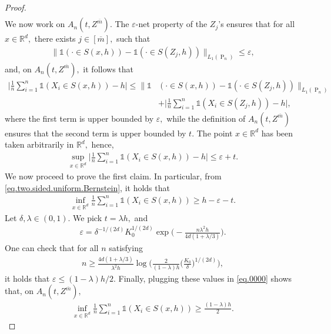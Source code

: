 \documentclass[10pt]{article}
\newcommand{\eps}{\varepsilon}
\newcommand{\RR}{\mathbb{R}}
\renewcommand{\P}{\operatorname{P}}
\newcommand{\ol}{\overline}
\begin{document}
\begin{proof}
\begin{align*}
    \end{align*}
    We now work on $A_n(t, Z^{\ol m}).$ The $\eps$-net property of the $Z_j$'s ensures that for all $x \in \RR^d,$ there exists $j \in [\ol m],$ such that
    \begin{align*}
        \big\|\mathds{1}(\cdot \in S(x, h)) - \mathds{1}(\cdot \in S(Z_j, h))\big\|_{L_1(\P_n)} \leq \eps,
    \end{align*}
    and, on $A_n(t, Z^{\ol m}),$ it follows that
    \begin{align*}
        \Big|\frac 1n \sum_{i=1}^n \mathds{1}(X_i \in S(x, h)) - h\Big| \leq \big\|\mathds{1}&(\cdot \in S(x, h)) - \mathds{1}(\cdot \in S(Z_j, h))\big\|_{L_1(\P_n)}\\
        &+ \Big|\frac 1n \sum_{i=1}^n \mathds{1}(X_i \in S(Z_j, h)) - h\Big|,
    \end{align*}
    where the first term is upper bounded by $\eps,$ while the definition of $A_n(t, Z^{\ol m})$ ensures that the second term is upper bounded by $t.$ The point $x \in \RR^d$ has been taken arbitrarily in $\RR^d,$ hence,
    \begin{align}
        \label{eq.two.sided.uniform.Bernstein}
        \sup_{x \in \RR^d}\Big|\frac 1n \sum_{i=1}^n \mathds{1}(X_i \in S(x, h)) - h\Big| \leq \eps + t.
    \end{align}
    We now proceed to prove the first claim. In particular, from \eqref{eq.two.sided.uniform.Bernstein}, it holds that
    \begin{align}
        \label{eq.0000}
        \inf_{x \in \RR^d}\frac 1n \sum_{i=1}^n \mathds{1}(X_i \in S(x, h)) \geq h -
        \eps - t.
    \end{align}
    Let $\delta, \lambda \in (0, 1).$ We pick $t = \lambda h,$ and
    \begin{align*}
        \eps = \delta^{-1/(2d)}K_0^{1/(2d)}\exp\bigg(-\frac{n\lambda^2h}{4d(1 + \lambda/3)}\bigg).
    \end{align*}
    One can check that for all $n$ satisfying
    \begin{align*}
        n \geq \frac{4d(1 + \lambda/3)}{\lambda^2h}\log\bigg(\frac{2}{(1 - \lambda)h}\Big(\frac{K_0}{\delta}\Big)^{1/(2d)}\bigg),
    \end{align*}
    it holds that $\eps \leq (1 - \lambda)h/2.$ Finally, plugging these values in \eqref{eq.0000} shows that, on $A_n(t, Z^{\ol m}),$
    \begin{align*}
        \inf_{x \in \RR^d}\frac 1{n} \sum_{i=1}^n \mathds{1}(X_i \in S(x, h)) \geq \frac{(1 - \lambda)h}2.

\end{align*}
\end{proof}
\end{document}
